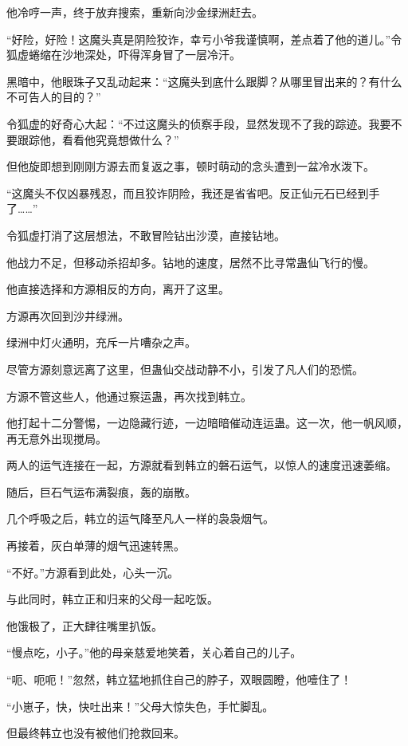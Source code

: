 \begin{this_body}
他冷哼一声，终于放弃搜索，重新向沙金绿洲赶去。

“好险，好险！这魔头真是阴险狡诈，幸亏小爷我谨慎啊，差点着了他的道儿。”令狐虚蜷缩在沙地深处，吓得浑身冒了一层冷汗。

黑暗中，他眼珠子又乱动起来：“这魔头到底什么跟脚？从哪里冒出来的？有什么不可告人的目的？”

令狐虚的好奇心大起：“不过这魔头的侦察手段，显然发现不了我的踪迹。我要不要跟踪他，看看他究竟想做什么？”

但他旋即想到刚刚方源去而复返之事，顿时萌动的念头遭到一盆冷水泼下。

“这魔头不仅凶暴残忍，而且狡诈阴险，我还是省省吧。反正仙元石已经到手了……”

令狐虚打消了这层想法，不敢冒险钻出沙漠，直接钻地。

他战力不足，但移动杀招却多。钻地的速度，居然不比寻常蛊仙飞行的慢。

他直接选择和方源相反的方向，离开了这里。

方源再次回到沙井绿洲。

绿洲中灯火通明，充斥一片嘈杂之声。

尽管方源刻意远离了这里，但蛊仙交战动静不小，引发了凡人们的恐慌。

方源不管这些人，他通过察运蛊，再次找到韩立。

他打起十二分警惕，一边隐藏行迹，一边暗暗催动连运蛊。这一次，他一帆风顺，再无意外出现搅局。

两人的运气连接在一起，方源就看到韩立的磐石运气，以惊人的速度迅速萎缩。

随后，巨石气运布满裂痕，轰的崩散。

几个呼吸之后，韩立的运气降至凡人一样的袅袅烟气。

再接着，灰白单薄的烟气迅速转黑。

“不好。”方源看到此处，心头一沉。

与此同时，韩立正和归来的父母一起吃饭。

他饿极了，正大肆往嘴里扒饭。

“慢点吃，小子。”他的母亲慈爱地笑着，关心着自己的儿子。

“呃、呃呃！”忽然，韩立猛地抓住自己的脖子，双眼圆瞪，他噎住了！

“小崽子，快，快吐出来！”父母大惊失色，手忙脚乱。

但最终韩立也没有被他们抢救回来。

\end{this_body}

